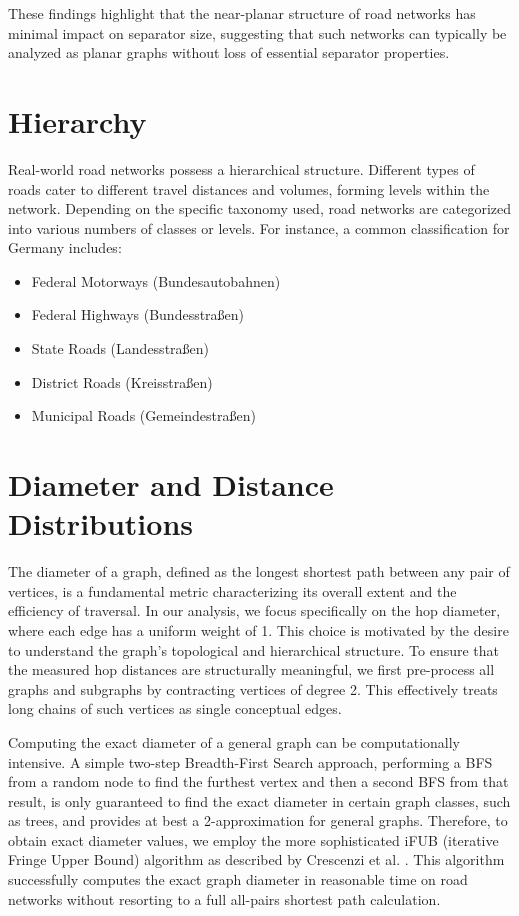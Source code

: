 These findings highlight that the near-planar structure of road networks has minimal impact on separator size, suggesting that such networks can typically be analyzed as planar graphs without loss of essential separator properties.

\section{Hierarchy}
\label{sec:hierarchy}

Real-world road networks possess a hierarchical structure.
Different types of roads cater to different travel distances and volumes, forming levels within the network.
Depending on the specific taxonomy used, road networks are categorized into various numbers of classes or levels.
For instance, a common classification for Germany includes:

\begin{itemize}
    \item Federal Motorways (Bundesautobahnen)
    \item Federal Highways (Bundesstraßen)
    \item State Roads (Landesstraßen)
    \item District Roads (Kreisstraßen)
    \item Municipal Roads (Gemeindestraßen)
\end{itemize}

\section{Diameter and Distance Distributions}
\label{sec:diameter}

The diameter of a graph, defined as the longest shortest path between any pair of vertices, is a fundamental metric characterizing its overall extent and the efficiency of traversal.
In our analysis, we focus specifically on the hop diameter, where each edge has a uniform weight of 1.
This choice is motivated by the desire to understand the graph's topological and hierarchical structure.
To ensure that the measured hop distances are structurally meaningful, we first pre-process all graphs and subgraphs by contracting vertices of degree 2.
This effectively treats long chains of such vertices as single conceptual edges.

Computing the exact diameter of a general graph can be computationally intensive.
A simple two-step Breadth-First Search approach, performing a BFS from a random node to find the furthest vertex and then a second BFS from that result, is only guaranteed to find the exact diameter in certain graph classes, such as trees, and provides at best a 2-approximation for general graphs.
Therefore, to obtain exact diameter values, we employ the more sophisticated iFUB (iterative Fringe Upper Bound) algorithm as described by Crescenzi et al. \cite{crescenzi_computing_2013}.
This algorithm successfully computes the exact graph diameter in reasonable time on road networks without resorting to a full all-pairs shortest path calculation.

